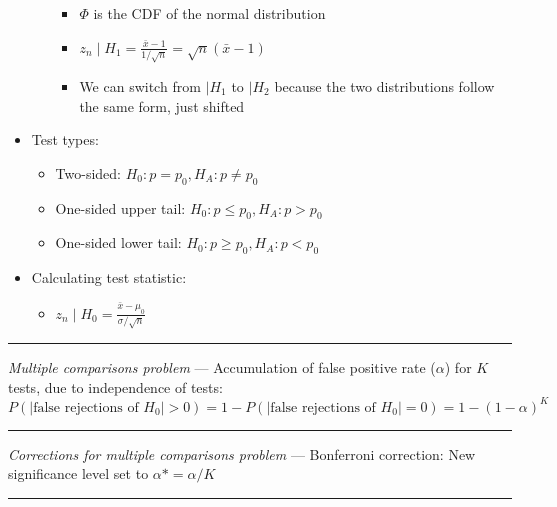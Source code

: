 \begin{itemize}
\begin{itemize}
\begin{itemize}
            \item $\Phi$ is the CDF of the normal distribution 
            \item $z_n \mid H_1 = \frac{\bar{x}-1}{1/\sqrt{n}} = \sqrt{n}(\bar{x}-1)$
            \item We can switch from $\mid H_1$ to $\mid H_2$ because the two distributions follow the same form, just shifted
        \end{itemize}
    \end{itemize}
    \item Test types:
    \begin{itemize}
        \item Two-sided: $H_0: p = p_0, H_A: p \neq p_0$
        \item One-sided upper tail: $H_0: p \leq p_0, H_A: p > p_0$
        \item One-sided lower tail: $H_0: p \geq p_0, H_A: p < p_0$
    \end{itemize}
    \item Calculating test statistic:
    \begin{itemize}
        \item $z_n \mid H_0 = \frac{\bar{x}-\mu_0}{\sigma/\sqrt{n}}$
    \end{itemize}
\end{itemize}

{\color{lightgray}\hrule height 0.001mm}

\emph{Multiple comparisons problem} ---
Accumulation of false positive rate ($\alpha$) for $K$ tests, due to independence of tests:
$P(|\textrm{false rejections of }H_0| > 0) = 1-P(|\textrm{false rejections of }H_0| = 0) = 1-(1-\alpha)^K$

{\color{lightgray}\hrule height 0.001mm}

\emph{Corrections for multiple comparisons problem} ---
Bonferroni correction: New significance level set to $\alpha* = \alpha / K$

{\color{lightgray}\hrule height 0.001mm}

